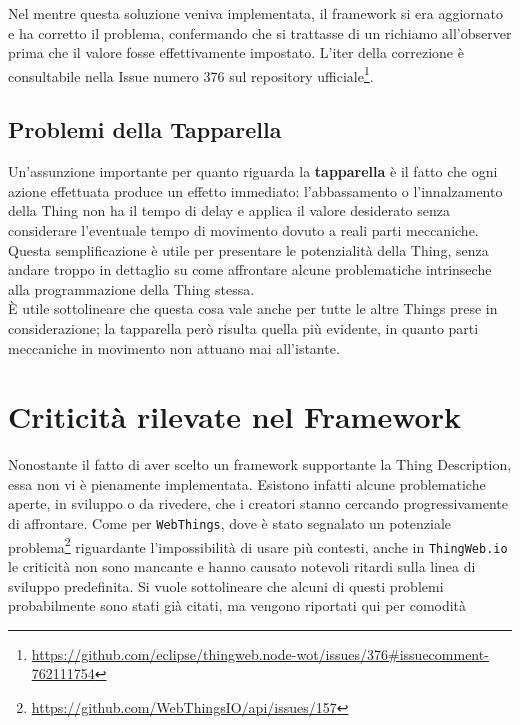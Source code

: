 \documentclass[12pt,a4paper,openright,oneside]{report}
\begin{document}
Nel mentre questa soluzione veniva implementata, il framework si era aggiornato e ha corretto il problema, confermando che si trattasse di un richiamo all'observer prima che il valore fosse effettivamente impostato. L'iter della correzione è consultabile nella Issue numero 376 sul repository ufficiale\footnote{\url{https://github.com/eclipse/thingweb.node-wot/issues/376\#issuecomment-762111754}}.

\subsection{Problemi della Tapparella}
Un'assunzione importante per quanto riguarda la \textbf{tapparella} è il fatto che ogni azione effettuata produce un effetto immediato: l'abbassamento o l'innalzamento della Thing non ha il tempo di delay e applica il valore desiderato senza considerare l'eventuale tempo di movimento dovuto a reali parti meccaniche. Questa semplificazione è utile per presentare le potenzialità della Thing, senza andare troppo in dettaglio su come affrontare alcune problematiche intrinseche alla programmazione della Thing stessa.\\

È utile sottolineare che questa cosa vale anche per tutte le altre Things prese in considerazione; la tapparella però risulta quella più evidente, in quanto parti meccaniche in movimento non attuano mai all'istante.



\section{Criticità rilevate nel Framework}
\label{sec:issues}
Nonostante il fatto di aver scelto un framework supportante la Thing Description, essa non vi è pienamente implementata. Esistono infatti alcune problematiche aperte, in sviluppo o da rivedere, che i creatori stanno cercando progressivamente di affrontare. Come per \texttt{WebThings}, dove è stato segnalato un potenziale problema\footnote{\url{https://github.com/WebThingsIO/api/issues/157}} riguardante l'impossibilità di usare più contesti, anche in \texttt{ThingWeb.io} le criticità non sono mancante e hanno causato notevoli ritardi sulla linea di sviluppo predefinita. Si vuole sottolineare che alcuni di questi problemi probabilmente sono stati già citati, ma vengono riportati qui per comodità
\end{document}
